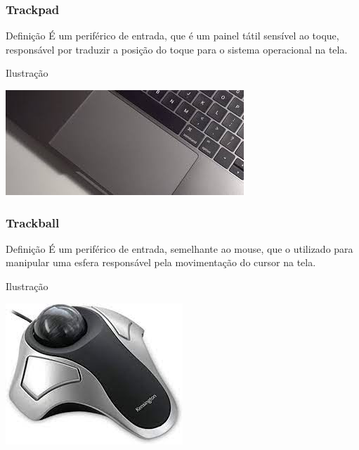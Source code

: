 \documentclass[aspectratio=169]{beamer} %
\begin{document}
\begin{frame}
	\frametitle{Trackpad}
	
	\begin{block}{Defini\c cão}
		É um periférico de entrada, que é um painel tátil sensível ao toque, responsável por traduzir a posição do toque para o sistema operacional na tela.
	\end{block}\vfill
	
	\begin{exampleblock}{Ilustra\c cão}
		\begin{center}
			\includegraphics[scale=0.4]{img/trackpad}
		\end{center}		
	\end{exampleblock}
\end{frame}

\begin{frame}
	\frametitle{Trackball}
	
	\begin{block}{Defini\c cão}
		É um periférico de entrada,  semelhante ao mouse,  que o utilizado para manipular uma esfera responsável pela movimenta\c cão do cursor na tela.
	\end{block}\vfill
	
	\begin{exampleblock}{Ilustra\c cão}
		\begin{center}
			\includegraphics[scale=0.4]{img/trackball}
		\end{center}		
	\end{exampleblock}
\end{frame}
\end{document}
